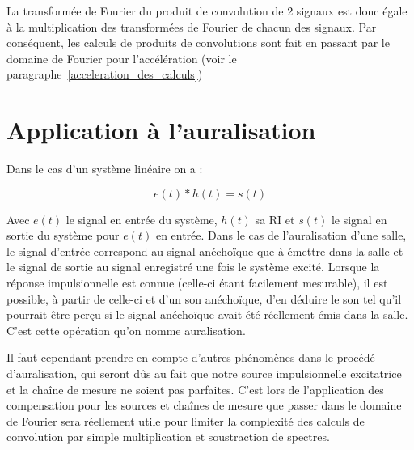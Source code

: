 La transformée de Fourier du produit de convolution de 2 signaux est donc égale à la multiplication des transformées de Fourier de chacun des signaux.
Par conséquent, les calculs de produits de convolutions sont fait en passant par le domaine de Fourier pour l'accélération (voir le paragraphe~\ref{acceleration_des_calculs})


\section{Application à l'auralisation} %

Dans le cas d'un système linéaire on a :

\begin{equation}
e(t) \ast h(t) = s(t)
\end{equation}

Avec $e(t)$ le signal en entrée du système, $h(t)$ sa RI et $s(t)$ le signal en sortie du système pour $e(t)$ en entrée.
Dans le cas de l'auralisation d'une salle, le signal d'entrée correspond au signal anéchoïque que à émettre dans la salle et le signal de sortie au signal enregistré une fois le système excité.
Lorsque la réponse impulsionnelle est connue (celle-ci étant facilement mesurable), il est possible, à partir de celle-ci et d'un son anéchoïque, d'en déduire le son tel qu'il pourrait être perçu si le signal anéchoïque avait été réellement émis dans la salle. C'est cette opération qu'on nomme auralisation.


Il faut cependant prendre en compte d'autres phénomènes dans le procédé d'auralisation, qui seront dûs au fait que notre source impulsionnelle excitatrice et la chaîne de mesure ne soient pas parfaites.
C'est lors de l'application des compensation pour les sources et chaînes de mesure que passer dans le domaine de Fourier sera réellement utile pour limiter la complexité des calculs de convolution par simple multiplication et soustraction de spectres.

